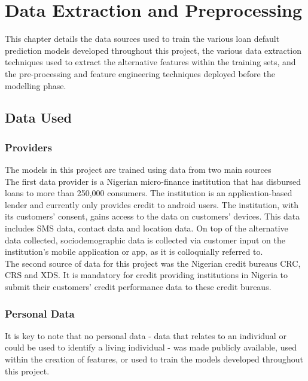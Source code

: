 \chapter{Data Extraction and Preprocessing} 
\label{Chapter3}

This chapter details the data sources used to train the various loan default prediction models developed throughout this project, the various data extraction techniques used to extract the alternative features within the training sets, and the pre-processing and feature engineering techniques deployed before the modelling phase.   

\section{Data Used}

\subsection{Providers}

The models in this project are trained using data from two main sources \\

The first data provider is a Nigerian micro-finance institution that has disbursed loans to more than 250,000 consumers. The institution is an application-based lender and currently only provides credit to android users. The institution, with its customers' consent, gains access to the data on customers' devices. This data includes SMS data, contact data and location data. On top of the alternative data collected, sociodemographic data is collected via customer input on the institution's mobile application or app, as it is colloquially referred to. \\

The second source of data for this project was the Nigerian credit bureaus CRC, CRS and XDS. It is mandatory for credit providing institutions in Nigeria to submit their customers' credit performance data to these credit bureaus.

\subsection{Personal Data}

It is key to note that no personal data - data that relates to an individual or could be used to identify a living individual - was made publicly available, used within the creation of features, or used to train the models developed throughout this project. 

